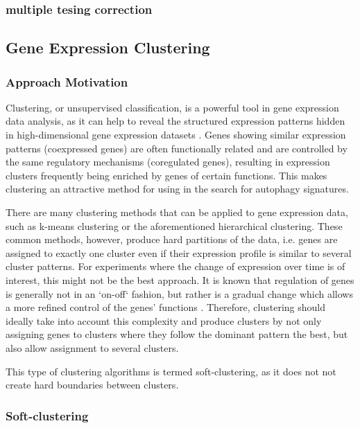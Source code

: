         \subsubsection{multiple tesing correction}



    \newpage
    \subsection{Gene Expression Clustering}
    
 
\subsubsection{Approach Motivation}
Clustering, or unsupervised classification,  is a powerful tool in gene expression data analysis, as it can help to reveal the structured expression patterns hidden in high-dimensional gene expression datasets \cite{Kumar2007Mfuzz:Data}. Genes showing similar expression patterns (coexpressed genes) are often functionally related and are controlled by the same regulatory mechanisms (coregulated genes), resulting  in expression clusters frequently being enriched by genes of certain functions. This makes clustering an attractive method for using in the search for autophagy signatures. 
 
There are many clustering methods that can be applied to gene expression data, such as k-means clustering or the aforementioned hierarchical clustering. These common methods, however, produce hard partitions of the data, i.e. genes are assigned to exactly one cluster even if their expression profile is similar to several cluster patterns. For experiments where the change of expression over time is of interest, this might not be the best approach. It is known that regulation of genes is generally not in an `on-off` fashion, but rather is a gradual change which allows a more refined control of the genes' functions  \cite{Kumar2007Mfuzz:Data}. Therefore, clustering should ideally take into account this complexity and produce clusters by not only assigning genes to clusters where they follow the dominant pattern the best, but also allow assignment to several clusters.
 
This type of clustering algorithms is termed soft-clustering, as it does not not create hard boundaries between clusters. 
 
\subsubsection{Soft-clustering}
 
